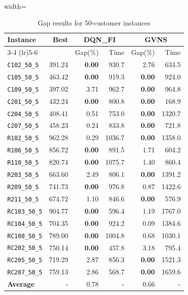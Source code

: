 \begin{table}[ht]
\centering
\small
\setlength{\tabcolsep}{5pt}
\caption{Gap results for 50-customer instances}
\vspace{4mm}
\begin{adjustbox}{width=\textwidth}
\begin{tabular}{l r r r @{\hspace{8pt}} r r @{\hspace{8pt}}}
\toprule
\multirow{2}{*}{Instance} & \multirow{2}{*}{Best} & \multicolumn{2}{c}{DQN\_FI} & \multicolumn{2}{c}{GVNS} \\
\cmidrule(lr){3-4} \cmidrule(lr){5-6}
 &  & Gap(\%) & Time & Gap(\%) & Time \\
\midrule
\texttt{C102\_50\_5} & 391.24 & \textbf{0.00} & 930.7 & 2.76 & 634.5 \\
\texttt{C105\_50\_5} & 463.42 & \textbf{0.00} & 919.3 & \textbf{0.00} & 924.0 \\
\texttt{C109\_50\_5} & 397.02 & 3.71 & 962.7 & \textbf{0.00} & 964.8 \\
\texttt{C201\_50\_5} & 432.24 & \textbf{0.00} & 800.8 & \textbf{0.00} & 168.9 \\
\texttt{C204\_50\_5} & 408.41 & 0.51 & 753.0 & \textbf{0.00} & 1320.7 \\
\texttt{C207\_50\_5} & 458.23 & 0.24 & 833.8 & \textbf{0.00} & 721.8 \\
\texttt{R102\_50\_5} & 962.28 & 0.29 & 1036.7 & \textbf{0.00} & 1358.0 \\
\texttt{R106\_50\_5} & 856.72 & \textbf{0.00} & 891.5 & 1.71 & 604.2 \\
\texttt{R110\_50\_5} & 820.74 & \textbf{0.00} & 1075.7 & 1.40 & 860.4 \\
\texttt{R203\_50\_5} & 663.60 & 2.49 & 806.1 & \textbf{0.00} & 1391.2 \\
\texttt{R209\_50\_5} & 741.73 & \textbf{0.00} & 976.8 & 0.87 & 1422.6 \\
\texttt{R211\_50\_5} & 674.72 & 1.10 & 846.6 & \textbf{0.00} & 576.9 \\
\texttt{RC103\_50\_5} & 904.77 & \textbf{0.00} & 596.4 & 1.19 & 1767.0 \\
\texttt{RC104\_50\_5} & 704.35 & \textbf{0.00} & 924.2 & 0.09 & 1384.6 \\
\texttt{RC108\_50\_5} & 789.00 & \textbf{0.00} & 1004.8 & 0.68 & 1030.1 \\
\texttt{RC202\_50\_5} & 750.14 & \textbf{0.00} & 457.8 & 3.18 & 795.4 \\
\texttt{RC205\_50\_5} & 719.29 & 2.87 & 856.3 & \textbf{0.00} & 1521.3 \\
\texttt{RC207\_50\_5} & 759.13 & 2.86 & 568.7 & \textbf{0.00} & 1659.6 \\
\midrule
\textbf{Average} & - & 0.78 & - & 0.66 & - \\
\bottomrule
\end{tabular}
\end{adjustbox}
\end{table}